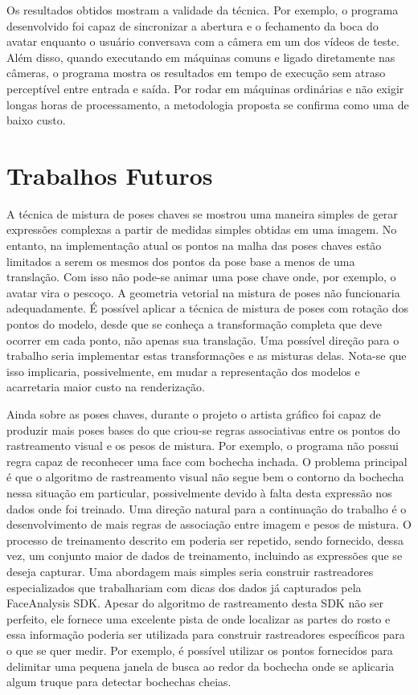 Os resultados obtidos mostram a validade da técnica. Por exemplo, o programa desenvolvido foi capaz de sincronizar a abertura e o fechamento da boca do avatar enquanto o usuário conversava com a câmera em um dos vídeos de teste. Além disso, quando executando em máquinas comuns e ligado diretamente nas câmeras, o programa mostra os resultados em tempo de execução sem atraso perceptível entre entrada e saída. Por rodar em máquinas ordinárias e não exigir longas horas de processamento, a metodologia proposta se confirma como uma de baixo custo.



\section{Trabalhos Futuros}

A técnica de mistura de poses chaves se mostrou uma maneira simples de gerar expressões complexas a partir de medidas simples obtidas em uma imagem. No entanto, na implementação atual os pontos na malha das poses chaves estão limitados a serem os mesmos dos pontos da pose base a menos de uma translação. Com isso não pode-se animar uma pose chave onde, por exemplo, o avatar vira o pescoço. A geometria vetorial na mistura de poses não funcionaria adequadamente. É possível aplicar a técnica de mistura de poses com rotação dos pontos do modelo, desde que se conheça a transformação completa que deve ocorrer em cada ponto, não apenas sua translação. Uma possível direção para o trabalho seria implementar estas transformações e as misturas delas. Nota-se que isso implicaria, possivelmente, em mudar a representação dos modelos e acarretaria maior custo na renderização. 

Ainda sobre as poses chaves, durante o projeto o artista gráfico foi capaz de produzir mais poses bases do que criou-se regras associativas entre os pontos do rastreamento visual e os pesos de mistura. Por exemplo, o programa não possui regra capaz de reconhecer uma face com bochecha inchada. O problema principal é que o algoritmo de rastreamento visual não segue bem o contorno da bochecha nessa situação em particular, possivelmente devido à falta desta expressão nos dados onde foi treinado. Uma direção natural para a continuação do trabalho é o desenvolvimento de mais regras de associação entre imagem e pesos de mistura. O processo de treinamento descrito em \cite{facetracker} poderia ser repetido, sendo fornecido, dessa vez, um conjunto maior de dados de treinamento, incluindo as expressões que se deseja capturar. Uma abordagem mais simples seria construir rastreadores especializados que trabalhariam com dicas dos dados já capturados pela FaceAnalysis SDK. Apesar do algoritmo de rastreamento desta SDK não ser perfeito, ele fornece uma excelente pista de onde localizar as partes do rosto e essa informação poderia ser utilizada para construir rastreadores específicos para o que se quer medir. Por exemplo, é possível utilizar os pontos fornecidos para delimitar uma pequena janela de busca ao redor da bochecha onde se aplicaria algum truque para detectar bochechas cheias.

